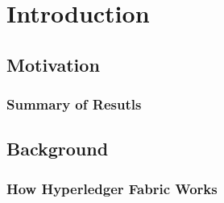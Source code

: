 \chapter{Introduction}

\section{Motivation}


\subsection{Summary of Resutls}


\section{Background}


\subsection{How Hyperledger Fabric Works}
